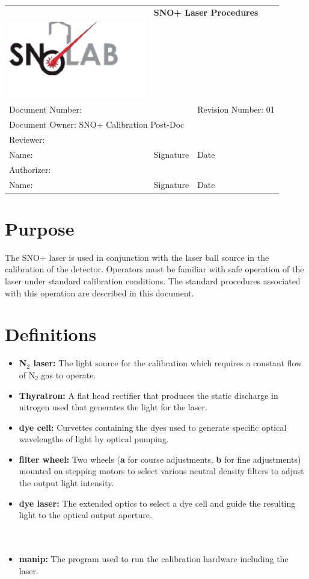 \documentclass[11pt]{article}
\begin{document}
\begin{tabular}{||l|l|l||}
\hline\hline
& \multicolumn{2}{p{8cm}||}{\bf SNO+ Laser Procedures} \\
\includegraphics[width=6cm]{../snolablogo.pdf} & \multicolumn{2}{p{8cm}||}{} \\
\hline
\multicolumn{2}{||p{8.5cm}|}{Document Number:} & Revision Number: 01\\
\hline
\multicolumn{3}{||l||}{Document Owner: SNO+ Calibration Post-Doc} \\
\hline
\multicolumn{3}{||l||}{Reviewer:}\\
\hline
Name: & Signature & Date \\
\hline
\multicolumn{3}{||l||}{Authorizer:}\\
\hline
Name: & Signature & Date \\
\hline\hline
\end{tabular}
\thispagestyle{empty}
\section{Purpose}

The SNO+ laser is used in conjunction with the laser ball source in the calibration of the detector. Operators must be familiar with safe operation of the laser under standard calibration conditions. The standard procedures associated with this operation are described in this document.

\section{Definitions}
\begin{itemize}
\item {\bf N$_{2}$ laser:} The light source for the calibration which requires a constant flow of N$_{2}$ gas to operate.
\item {\bf Thyratron:} A flat head rectifier that produces the static discharge in nitrogen used that generates the light for the laser.
\item {\bf dye cell:} Curvettes containing the dyes used to generate specific optical wavelengths of light by optical pumping. 
\item {\bf filter wheel:} Two wheels ({\bf a} for course adjustments, {\bf b} for fine adjustments) mounted on stepping motors to select various neutral density filters to adjust the output light intensity.
\item {\bf dye laser:} The extended optics to select a dye cell and guide the resulting light to the optical output aperture.\\ \\ \\
\item {\bf manip:} The program used to run the calibration hardware including the laser.\\ 
\end{itemize}
\end{document}
